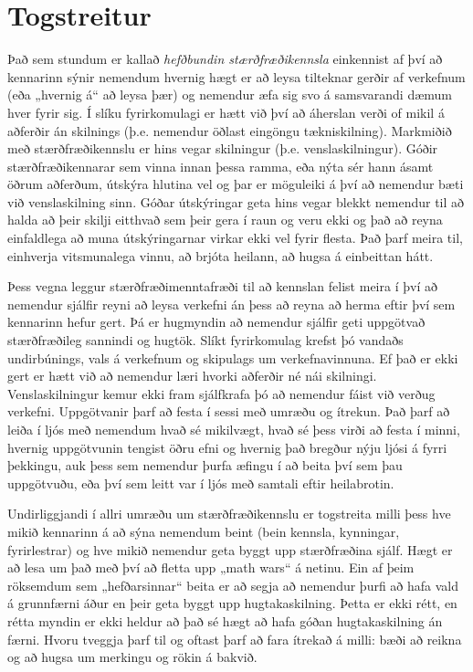 \documentclass[
  icelandic,
]{book}
\theoremstyle{definition}
\theoremstyle{definition}
\theoremstyle{definition}
\theoremstyle{definition}
\theoremstyle{remark}
\begin{document}
\section{Togstreitur}\label{togstreitur}

Það sem stundum er kallað \emph{hefðbundin stærðfræðikennsla} einkennist af því að kennarinn sýnir nemendum hvernig hægt er að leysa tilteknar gerðir af verkefnum (eða „hvernig á`` að leysa þær) og nemendur æfa sig svo á samsvarandi dæmum hver fyrir sig. Í slíku fyrirkomulagi er hætt við því að áherslan verði of mikil á aðferðir án skilnings (þ.e. nemendur öðlast eingöngu tækniskilning). Markmiðið með stærðfræðikennslu er hins vegar skilningur (þ.e. venslaskilningur). Góðir stærðfræðikennarar sem vinna innan þessa ramma, eða nýta sér hann ásamt öðrum aðferðum, útskýra hlutina vel og þar er möguleiki á því að nemendur bæti við venslaskilning sinn. Góðar útskýringar geta hins vegar blekkt nemendur til að halda að þeir skilji eitthvað sem þeir gera í raun og veru ekki og það að reyna einfaldlega að muna útskýringarnar virkar ekki vel fyrir flesta. Það þarf meira til, einhverja vitsmunalega vinnu, að brjóta heilann, að hugsa á einbeittan hátt.

Þess vegna leggur stærðfræðimenntafræði til að kennslan felist meira í því að nemendur sjálfir reyni að leysa verkefni án þess að reyna að herma eftir því sem kennarinn hefur gert. Þá er hugmyndin að nemendur sjálfir geti uppgötvað stærðfræðileg sannindi og hugtök. Slíkt fyrirkomulag krefst þó vandaðs undirbúnings, vals á verkefnum og skipulags um verkefnavinnuna. Ef það er ekki gert er hætt við að nemendur læri hvorki aðferðir né nái skilningi. Venslaskilningur kemur ekki fram sjálfkrafa þó að nemendur fáist við verðug verkefni. Uppgötvanir þarf að festa í sessi með umræðu og ítrekun. Það þarf að leiða í ljós með nemendum hvað sé mikilvægt, hvað sé þess virði að festa í minni, hvernig uppgötvunin tengist öðru efni og hvernig það bregður nýju ljósi á fyrri þekkingu, auk þess sem nemendur þurfa æfingu í að beita því sem þau uppgötvuðu, eða því sem leitt var í ljós með samtali eftir heilabrotin.

Undirliggjandi í allri umræðu um stærðfræðikennslu er togstreita milli þess hve mikið kennarinn á að sýna nemendum beint (bein kennsla, kynningar, fyrirlestrar) og hve mikið nemendur geta byggt upp stærðfræðina sjálf. Hægt er að lesa um það með því að fletta upp „math wars`` á netinu. Ein af þeim röksemdum sem „hefðarsinnar`` beita er að segja að nemendur þurfi að hafa vald á grunnfærni áður en þeir geta byggt upp hugtakaskilning. Þetta er ekki rétt, en rétta myndin er ekki heldur að það sé hægt að hafa góðan hugtakaskilning án færni. Hvoru tveggja þarf til og oftast þarf að fara ítrekað á milli: bæði að reikna og að hugsa um merkingu og rökin á bakvið.
\end{document}
